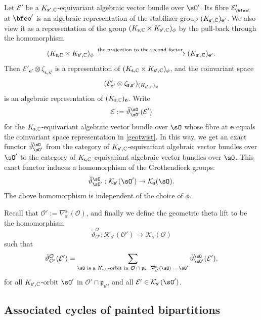 \documentclass[11pt,a4paper]{amsart}
\newcommand{\CE}{{\mathcal {E}}}
\newcommand{\CK}{{\mathcal {K}}}
\newcommand{\CO}{{\mathcal {O}}}
\newcommand{\p}{\mathfrak p}
\numberwithin{equation}{section}
\theoremstyle{remark}
\begin{document}
 Let $\CE'$ be a $K_{\mathsf s',\mathbb{C}}$-equivariant algebraic vector bundle  over $\sO'$. Its fibre
$\CE'_{\bfee'}$ at $\bfee'$ is an algebraic representation of the stabilizer group $(K_{\mathsf s',\mathbb{C}})_{\mathbf e'}$. We also view it as a representation of the group
$(K_{\mathsf s,\mathbb{C}}\times K_{\mathsf s', \mathbb{C}})_\phi$ by the pull-back through the homomorphism
\[
  (K_{\mathsf s,\mathbb{C}}\times K_{\mathsf s', \mathbb{C}})_\phi\xrightarrow{\textrm{the projection to the second factor}} (K_{\mathsf s',\mathbb{C}})_{\mathbf e'}.
\]
Then $\CE'_{\mathbf e'} \otimes \zeta_{\mathsf s, \mathsf s'}$ is a representation of $ (K_{\mathsf s,\mathbb{C}}\times K_{\mathsf s', \mathbb{C}})_\phi$, and the coinvariant space
\begin{equation}\label{geotwist}
(\CE'_{\mathbf e'} \otimes \zeta_{\mathsf s, \mathsf s'})_{ (K_{\mathsf s',\C})_\phi}
\end{equation}
 is an algebraic representation of $(K_{\mathsf s,\mathbb{C}})_{\mathbf e}$. Write 
 \begin{equation}\label{liftab}
\CE:= \check \vartheta_{\sO'}^{\sO}(\mathcal E')
\end{equation} 
for the  $K_{\mathsf s,\mathbb{C}}$-equivariant algebraic vector bundle  over $\sO$ whose fibre at $\mathbf e$ equals the coinvariant space representation in \eqref{geotwist}. In this way, we get an exact functor $  \check \vartheta_{\sO'}^{\sO}$ from the category of
$K_{\mathsf s',\mathbb{C}}$-equivariant algebraic vector bundles  over $\sO'$ to the category of $K_{\mathsf s,\mathbb{C}}$-equivariant algebraic vector bundles  over $\sO$. This exact functor induces a  homomorphism of the  Grothendieck groups:
\[
   \check \vartheta_{\sO'}^{\sO}:  \CK_{\mathsf s'}(\sO')\rightarrow  \CK_{\mathsf s}(\sO).
\]
The above homomorphism is independent of the choice of $\phi$.


Recall that $\CO':= \nabla^{\mathsf s}_{\mathsf s'}(\CO)$, and finally we define the geometric theta lift to be the homomorphism
\begin{equation}\label{defn:geolift}
 \check \vartheta_{\CO'}^{\CO}: \CK_{\mathsf s'}(\CO')\rightarrow \CK_{\mathsf s}(\CO)
\end{equation}
such that
\[
 \check \vartheta_{\CO'}^{\CO}(\CE')= \sum_{\sO\textrm{ is a $K_{\mathsf s, \C} $-orbit in $\CO\cap \p_{\mathsf s}$,  $\, \nabla^{\mathsf s}_{\mathsf s'}(\sO)=\sO'$}}    \check \vartheta_{\sO'}^{\sO}(\CE'),
\]
for all $K_{\mathsf s', \mathbb{C}} $-orbit $\sO'$ in $\CO'\cap \p_{\mathsf s'}$, and all $\CE'\in \CK_{\mathsf s'}(\sO')$.


\subsection{Associated cycles of painted bipartitions}\label{subsecass}
\end{document}
